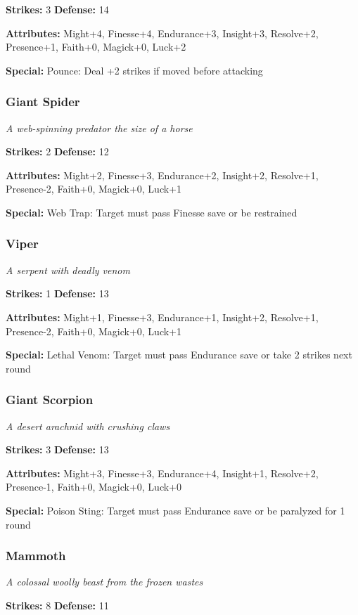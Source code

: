 \documentclass[10pt,twoside]{article}
\begin{document}
\textbf{Strikes:} 3 \quad \textbf{Defense:} 14

\textbf{Attributes:} Might+4, Finesse+4, Endurance+3, Insight+3, Resolve+2, Presence+1, Faith+0, Magick+0, Luck+2

\textbf{Special:} Pounce: Deal +2 strikes if moved before attacking

\subsubsection{Giant Spider}
\textit{A web-spinning predator the size of a horse}

\textbf{Strikes:} 2 \quad \textbf{Defense:} 12

\textbf{Attributes:} Might+2, Finesse+3, Endurance+2, Insight+2, Resolve+1, Presence-2, Faith+0, Magick+0, Luck+1

\textbf{Special:} Web Trap: Target must pass Finesse save or be restrained

\subsubsection{Viper}
\textit{A serpent with deadly venom}

\textbf{Strikes:} 1 \quad \textbf{Defense:} 13

\textbf{Attributes:} Might+1, Finesse+3, Endurance+1, Insight+2, Resolve+1, Presence-2, Faith+0, Magick+0, Luck+1

\textbf{Special:} Lethal Venom: Target must pass Endurance save or take 2 strikes next round

\subsubsection{Giant Scorpion}
\textit{A desert arachnid with crushing claws}

\textbf{Strikes:} 3 \quad \textbf{Defense:} 13

\textbf{Attributes:} Might+3, Finesse+3, Endurance+4, Insight+1, Resolve+2, Presence-1, Faith+0, Magick+0, Luck+0

\textbf{Special:} Poison Sting: Target must pass Endurance save or be paralyzed for 1 round

\subsubsection{Mammoth}
\textit{A colossal woolly beast from the frozen wastes}

\textbf{Strikes:} 8 \quad \textbf{Defense:} 11
\end{document}
